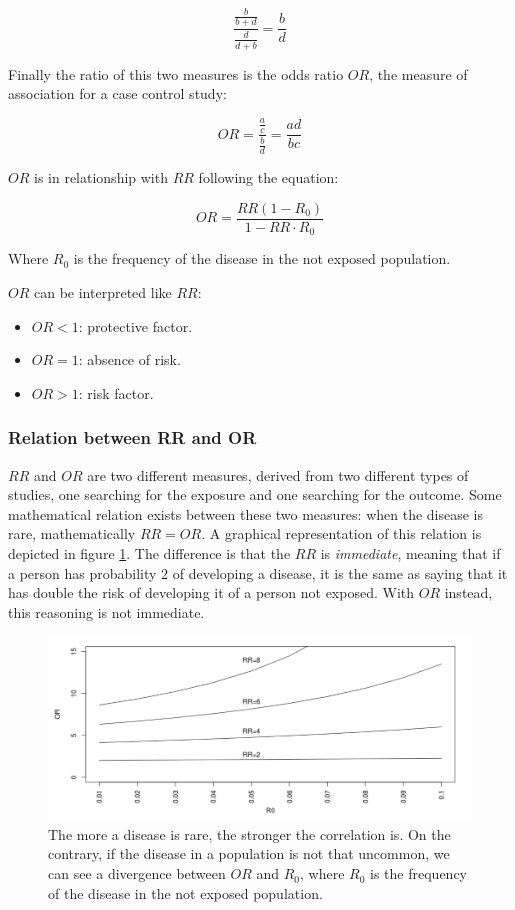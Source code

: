 		$$\frac{\frac{b}{b+d}}{\frac{d}{d+b}} = \frac{b}{d}$$

		Finally the ratio of this two measures is the odds ratio $OR$, the measure of association for a case control study:

		$$OR = \frac{\frac{a}{c}}{\frac{b}{d}} = \frac{ad}{bc}$$

		$OR$ is in relationship with $RR$ following the equation:

		$$OR = \frac{RR(1-R_0)}{1-RR\cdot R_0}$$

		Where $R_0$ is the frequency of the disease in the not exposed population.

		$OR$ can be interpreted like $RR$:

		\begin{multicols}{3}
			\begin{itemize}
				\item $OR <1$: protective factor.
				\item $OR = 1$: absence of risk.
				\item $OR > 1$: risk factor.
			\end{itemize}
		\end{multicols}

		\subsubsection*{Relation between RR and OR}
		$RR$ and $OR$ are two different measures, derived from two different types of studies, one searching for the exposure and one searching for the outcome.
		Some mathematical relation exists between these two measures: when the disease is rare, mathematically $RR = OR$.
		A graphical representation of this relation is depicted in figure \ref{fig:divergence}.
		The difference is that the $RR$ is \textit{immediate}, meaning that if a person has probability $2$ of developing a disease, it is the same as saying that it has double the risk of developing it of a person not exposed.
		With $OR$ instead, this reasoning is not immediate.

		\begin{figure}[H]
		\centering
		\includegraphics[scale=0.3]{divergence}
		\caption{The more a disease is rare, the stronger the correlation is. On the contrary, if the disease in a population is not that uncommon, we can see a divergence between $OR$ and $R_0$, where $R_0$ is the frequency of the disease in the not exposed population.}
		\label{fig:divergence}
		\end{figure}



